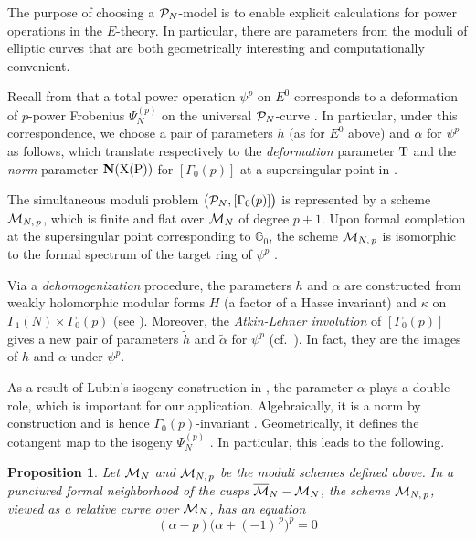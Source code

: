 \documentclass{gtpart}
\newtheorem{prop}[equation]{Proposition}
\theoremstyle{definition}
\theoremstyle{remark}
\newcommand{\mb}[1]{\mathbb{#1}}
\newcommand{\CM}{{\cal M}}
\newcommand{\CMB}{\overline {\cal M}}
\newcommand{\CP}{{\cal P}}
\newcommand{\BG}{{\mb G}}
\newcommand{\tA}{\widetilde{\A}}
\renewcommand{\th}{\widetilde{h}}
\newcommand{\A}{\alpha}
\newcommand{\G}{\Gamma}
\newcommand{\K}{\kappa}
\renewcommand{\=}{\approx}
\renewcommand{\-}{\sim}
\numberwithin{equation}{section}
\begin{document}
The purpose of choosing a $\CP_N$-model is to enable explicit calculations for 
power operations in the $E$-theory.  In particular, there are parameters from 
the moduli of elliptic curves that are both geometrically interesting and 
computationally convenient.  

Recall from \cite[Section 3.1]{ho} that a total power operation $\psi^p$ on 
$E^0$ corresponds to a deformation of $p$-power Frobenius $\Psi_N^{(p)}$ on the 
universal $\CP_N$-curve \cite[Theorem B]{cong}.  In particular, under this 
correspondence, we choose a pair of parameters $h$ (as for $E^0$ above) and $\A$ 
for $\psi^p$ as follows, which translate respectively to the {\em deformation} 
parameter $\rm T$ and the {\em norm} parameter $\rm {\bf N}(X(P))$ for 
$[\G_0(p)]$ at a supersingular point in \cite[Section 7.7]{KM}.  

The simultaneous moduli problem $\big(\CP_N,[\G_0(p)]\big)$ is represented by a 
scheme $\CM_{N,\,p}$, which is finite and flat over $\CM_N$ of degree $p + 1$.  
Upon formal completion at the supersingular point corresponding to $\BG_0$, the 
scheme $\CM_{N,\,p}$ is isomorphic to the formal spectrum of the target ring of 
$\psi^p$ \cite[Theorem 1.1]{Str98}.  

Via a {\em dehomogenization} procedure, the parameters $h$ and $\A$ are 
constructed from weakly holomorphic modular forms $H$ (a factor of a Hasse 
invariant) and $\K$ on $\G_1(N) \times \G_0(p)$ (see 
\cite[Proposition 2.8 and Examples 2.6 and 3.4]{ho}).  Moreover, the 
{\em Atkin-Lehner involution} of $[\G_0(p)]$ gives a new pair of parameters 
$\th$ and $\tA$ for $\psi^p$ (cf.~\cite[11.3.1]{KM}).  In fact, they are the 
images of $h$ and $\A$ under $\psi^p$.  

As a result of Lubin's isogeny construction in 
\cite[proof of Theorem 1.4]{Lubin}, the parameter $\A$ plays a double role, 
which is important for our application.  Algebraically, it is a norm by 
construction and is hence $\G_0(p)$-invariant \cite[Construction 3.1\,(ii)]{ho}.  
Geometrically, it defines the cotangent map to the isogeny $\Psi_N^{(p)}$ 
\cite[Remark 3.2]{ho}.  In particular, this leads to the following.  

\begin{prop}
 \label{prop:cusps}
 Let $\CM_N$ and $\CM_{N,\,p}$ be the moduli schemes defined above.  In a 
 punctured formal neighborhood of the cusps $\CMB_N - \CM_N$, the scheme 
 $\CM_{N,\,p}$, viewed as a relative curve over $\CM_N$, has an equation 
 \[
  (\A - p) \big(\A + (-1)^{\,p}\big)^p = 0 
 \]
\end{prop}
\end{document}
